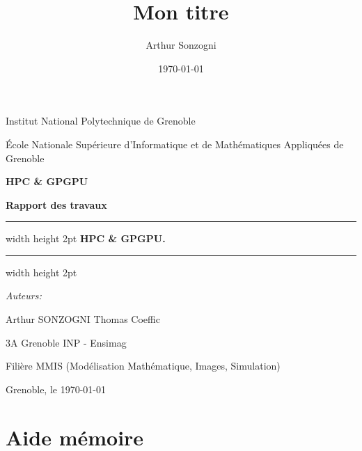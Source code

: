 \documentclass[liens,entete-ensimag,margeCorrection]{ensirapport}
\begin{document}
\title{Mon titre}
\author{Arthur Sonzogni}
\date{\today}

\renewcommand{\labelitemi}{\textbullet}

\large
\thispagestyle{plain}

\begin{center}


Institut National Polytechnique de Grenoble

École Nationale Supérieure d'Informatique et de Mathématiques Appliquées de
Grenoble

\vspace{0.4cm}


{\huge \bfseries HPC \& GPGPU}

\vspace{0.5cm}
{\large \bfseries Rapport des travaux}


\vspace{1.5cm}

\hrule width \textwidth height 2pt
\vspace{0.4cm}
{\Huge \bfseries HPC \& GPGPU.}
\vspace{0.4cm}
\hrule width \textwidth height 2pt

\vspace{2cm}

\end{center}
\begin{minipage}{0.5\textwidth}
    
{\it Auteurs:}

Arthur SONZOGNI
Thomas Coeffic

3A Grenoble INP - Ensimag

Filière MMIS (Modélisation Mathématique, Images, Simulation)

\end{minipage}


\vspace{2cm}

\begin{center}
Grenoble, le \today
\end{center}

\newpage
\normalsize

\tableofcontents

\section{Aide mémoire}
\end{document}

